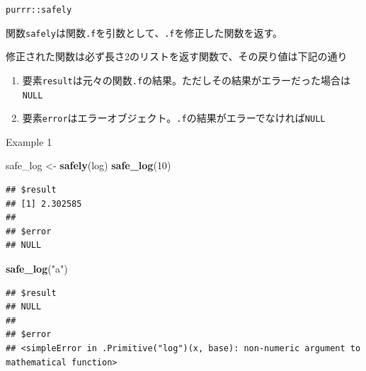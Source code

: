 \documentclass[ignorenonframetext,]{beamer}
\newenvironment{Shaded}{\begin{snugshade}}{\end{snugshade}}
\newcommand{\KeywordTok}[1]{\textcolor[rgb]{0.13,0.29,0.53}{\textbf{#1}}}
\newcommand{\DecValTok}[1]{\textcolor[rgb]{0.00,0.00,0.81}{#1}}
\newcommand{\StringTok}[1]{\textcolor[rgb]{0.31,0.60,0.02}{#1}}
\newcommand{\NormalTok}[1]{#1}
\providecommand{\tightlist}{%
  \setlength{\itemsep}{0pt}\setlength{\parskip}{0pt}}
\begin{document}
\begin{frame}[fragile]{\texttt{purrr::safely}}

関数\texttt{safely}は関数\texttt{.f}を引数として、\texttt{.f}を修正した関数を返す。

修正された関数は必ず長さ2のリストを返す関数で、その戻り値は下記の通り

\begin{enumerate}
\def\labelenumi{\arabic{enumi}.}
\tightlist
\item
  要素\texttt{result}は元々の関数\texttt{.f}の結果。ただしその結果がエラーだった場合は\texttt{NULL}
\item
  要素\texttt{error}はエラーオブジェクト。\texttt{.f}の結果がエラーでなければ\texttt{NULL}
\end{enumerate}

\end{frame}

\begin{frame}[fragile]{Example 1}

\begin{Shaded}
\begin{Highlighting}[]
\NormalTok{safe_log <-}\StringTok{ }\KeywordTok{safely}\NormalTok{(log)}
\KeywordTok{safe_log}\NormalTok{(}\DecValTok{10}\NormalTok{)}
\end{Highlighting}
\end{Shaded}

\begin{verbatim}
## $result
## [1] 2.302585
## 
## $error
## NULL
\end{verbatim}

\begin{Shaded}
\begin{Highlighting}[]
\KeywordTok{safe_log}\NormalTok{(}\StringTok{"a"}\NormalTok{)}
\end{Highlighting}
\end{Shaded}

\begin{verbatim}
## $result
## NULL
## 
## $error
## <simpleError in .Primitive("log")(x, base): non-numeric argument to mathematical function>
\end{verbatim}

\end{frame}
\end{document}
